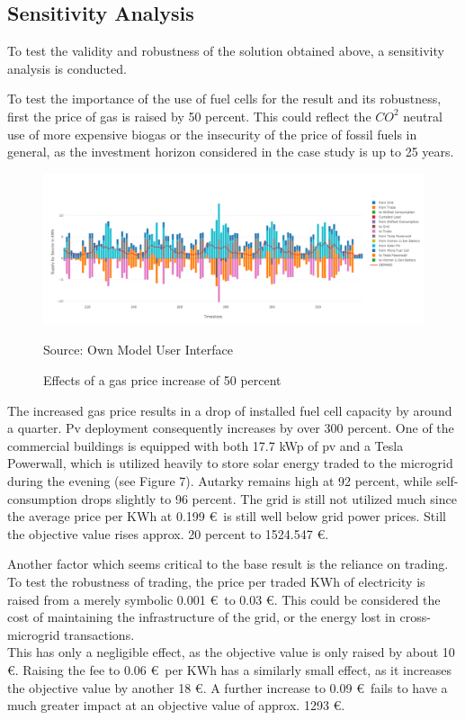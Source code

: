\documentclass[
	11pt,								%
	DIV10,								%
	a4paper,         					%
	oneside,							%
	headheight=20pt,					%
	footheight=20pt,					%
    parskip=full,						%
    listof=totoc,						%
	bibliography=totoc,					%
	index=totoc,						%
]{scrartcl}
\begin{document}
\subsection{Sensitivity Analysis}
To test the validity and robustness of the solution obtained above, a sensitivity analysis is conducted. 

To test the importance of the use of fuel cells for the result and its robustness, first the price of gas is raised by 50 percent. This could reflect the $CO^2$ neutral use of more expensive biogas or the insecurity of the price of fossil fuels in general, as the investment horizon considered in the case study is up to 25 years.
\begin{figure}[H]
	\centering
	\includegraphics[width=1\textwidth]{pictures/SCEN_1.png}
	\caption{Effects of a gas price increase of 50 percent}
	\label{commercial_dispatch_base}
	\flushleft\quad\quad\footnotesize{Source: Own Model User Interface}
\end{figure}	

The increased gas price results in a drop of installed fuel cell capacity by around a quarter. Pv deployment consequently increases by over 300 percent. One of the commercial buildings is equipped with both 17.7 kWp of pv and a Tesla Powerwall, which is utilized heavily to store solar energy traded to the microgrid during the evening (see Figure 7). Autarky remains high at 92 percent, while self-consumption drops slightly to 96 percent. The grid is still not utilized much since the average price per KWh at 0.199 \euro\ is still well below grid power prices. Still the objective value rises approx. 20 percent to 1524.547 \euro.

Another factor which seems critical to the base result is the reliance on trading. To test the robustness of trading, the price per traded KWh of electricity is raised from a merely symbolic 0.001 \euro\ to 0.03 \euro. This could be considered the cost of maintaining the infrastructure of the grid, or the energy lost in cross-microgrid transactions.
\\
This has only a negligible effect, as the objective value is only raised by about 10 \euro. Raising the fee to 0.06 \euro\ per KWh has a similarly small effect, as it increases the objective value by another 18 \euro. A further increase to 0.09 \euro\ fails to have a much greater impact at an objective value of approx. 1293 \euro. 
\end{document}
